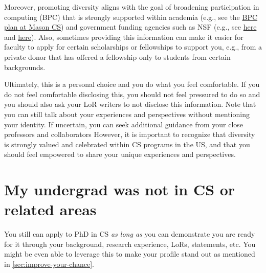 \documentclass[oneside,11pt,dvipsnames]{book}
\def\sectioninfo#1{%
  \addcontentsline{toc}{sectioninfo}{%
    \noexpand\numberline{}\color{black}{#1}}%
}
\begin{document}
Moreover, promoting diversity aligns with the goal of broadening participation in computing (BPC) that is strongly supported within academia (e.g., see the \href{https://plans.bpcnet.org/GeorgeMasonUniversity_ComputerScience_DepartmentalBPCPlan.pdf}{BPC plan at Mason CS}) and government funding agencies such as NSF (e.g., see \href{https://new.nsf.gov/cise/broadening-participation}{here} and \href{https://www.nsf.gov/pubs/2022/nsf22125/nsf22125.jsp}{here}).
Also, sometimes providing this information can make it easier for faculty to apply for certain scholarships or fellowships to support you, e.g., from a private donor that has offered a fellowship only to students from certain backgrounds.

Ultimately, this is a personal choice and you do what you feel comfortable.
If you do not feel comfortable disclosing this, you should not feel pressured to do so and you should also ask your LoR writers to not disclose this information.
Note that you can still talk about your experiences and perspectives without mentioning your identity.
If uncertain, you can seek additional guidance from your close professors and collaborators However, it is important to recognize that diversity is strongly valued and celebrated within CS programs in the US, and that you should feel empowered to share your unique experiences and perspectives.





\section{My undergrad was not in CS or related areas}\label{sec:non-stem}
\sectioninfo{You can successfully apply to CS PhD even if you have non-CS background.}

You still can apply to PhD in CS \emph{as long as} you can demonstrate you are ready for it through your background, research experience, LoRs, statements, etc. You might be even able to leverage this to make your profile stand out as mentioned in \autoref{sec:improve-your-chance}.
\end{document}
